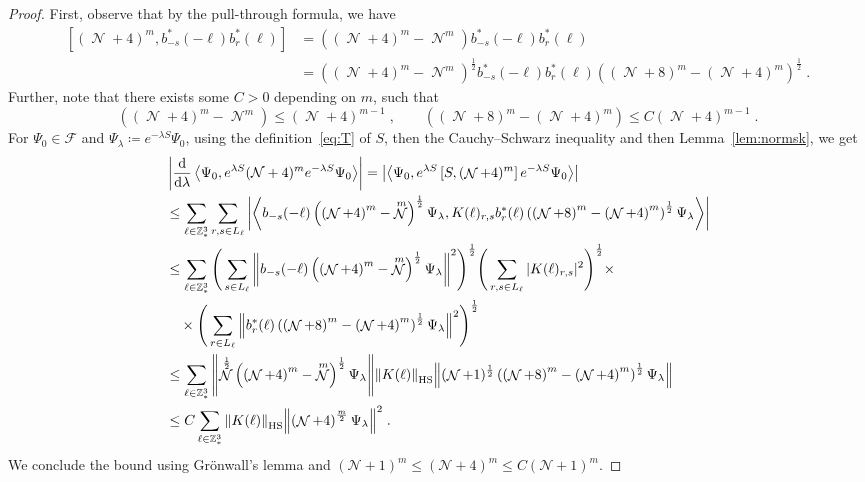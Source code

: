\documentclass[12pt,a4paper]{article}
\numberwithin{equation}{section}
\newcommand{\cF}{\mathcal{F}}
\newcommand{\cN}{\mathcal{N}}
\newcommand{\1}{\mathbb{I}}
\newcommand{\di}{\textnormal{d}}
\newcommand{\HS}{\mathrm{HS}}
\DeclareMathOperator{\NN}{\mathcal{N}}
\newcommand{\half}{\frac{1}{2}}
\newcommand{\eva}[1]{\left\langle #1 \right\rangle}
\theoremstyle{plain}
\theoremstyle{definition}
\theoremstyle{remark}
\theoremstyle{plain}
\theoremstyle{definition}
\theoremstyle{remark}
\begin{document}
\begin{proof}
First, observe that by the pull-through formula, we have
\begin{align}
	\left[(\NN+4)^m, b^*_{-s}(-\ell)b^*_{r}(\ell)\right] &= \left( (\NN+4)^m - \NN^m \right) b^*_{-s}(-\ell)b^*_{r}(\ell) \nonumber \\
	&= \left( \left(\NN+4\right)^m - \NN^m \right)^\half b^*_{-s}(-\ell)b^*_{r}(\ell) \left( \left(\NN+8\right)^m - \left(\NN+4\right)^m \right)^\half \;.
\end{align}
Further, note that there exists some $ C > 0 $ depending on $ m $, such that
\begin{equation}
	\left( \left(\NN+4\right)^m - \NN^m \right)
	\leq \left(\NN+4\right)^{m-1} \;, \qquad
	\left( \left(\NN+8\right)^m - \left(\NN+4\right)^m \right)
	\leq C \left(\NN+4\right)^{m-1} \;.
\end{equation}
For $ \Psi_0 \in \cF $ and $ \Psi_\lambda \coloneq e^{-\lambda S} \Psi_0 $, using the definition~\eqref{eq:T} of $ S $, then the Cauchy--Schwarz inequality and then Lemma~\ref{lem:normsk}, we get
\begin{align}
	&\left|\frac{\di}{\di\lambda}\eva{\Psi_0, e^{\lambda S} (\mathcal{N}+4)^m e^{-\lambda S} \Psi_0 }\right|
	= \left| \eva{\Psi_0, e^{\lambda S} \left[S, (\NN+4)^m\right] e^{-\lambda S} \Psi_0}\right|\nonumber\\
	&\leq \sum_{\ell\in \mathbb{Z}^3_*}
		\sum_{r,s\in L_\ell} \abs{\eva{ b_{-s}(-\ell) \left( \left(\NN+4\right)^m - \NN^m \right)^\half \Psi_\lambda, K(\ell)_{r,s} b^*_{r}(\ell) \left( \left(\NN+8\right)^m - \left(\NN+4\right)^m \right)^\half \Psi_\lambda }}\nonumber\\
	&\leq \sum_{\ell\in \mathbb{Z}^3_*}
		\Bigg( \sum_{s\in L_\ell} \norm{ b_{-s}(-\ell) \left( \left(\NN+4\right)^m - \NN^m \right)^\half \Psi_\lambda}^2 \Bigg)^{\half}
		\Bigg( \sum_{r,s\in L_\ell} |K(\ell)_{r,s}|^2 \Bigg)^{\half} \times \nonumber\\
		&\quad \times \Bigg( \sum_{r\in L_\ell} \norm {b^*_{r}(\ell) \left( \left(\NN+8\right)^m - \left(\NN+4\right)^m \right)^\half \Psi_\lambda}^2 \Bigg)^{\half} \nonumber\\
	&\leq \sum_{\ell\in \mathbb{Z}^3_*}
		\norm{ \NN^\half \left( \left(\NN+4\right)^m - \NN^m \right)^\half \Psi_\lambda}
		\norm{K(\ell)}_{\HS}
		\norm{ (\NN+1)^\half \left( \left(\NN+8\right)^m - \left(\NN+4\right)^m \right)^\half \Psi_\lambda } \nonumber\\
	&\leq C \sum_{\ell\in \mathbb{Z}^3_*}
		\norm{K(\ell)}_{\HS}
		\norm{ \left(\NN+4\right)^\frac{m}{2} \Psi_\lambda}^2 \;.
\end{align}
We conclude the bound using Gr\"onwall's lemma and $ (\cN+1)^m \le (\cN+4)^m \le C (\cN+1)^m $.
\end{proof}
\end{document}

